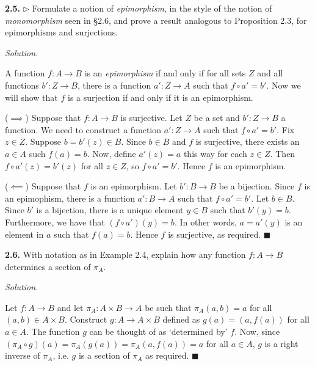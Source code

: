\documentclass[14pt,parskip=full]{scrartcl}
\newcommand{\exercise}[3]{
\noindent
\textbf{#1.} #2

\noindent
\textit{Solution.}{\let\tpar\par \let\par\relax #3}
}
\newcommand*{\QEDA}{\hfill\ensuremath{\blacksquare}}
\begin{document}
\exercise{2.5}{$\rhd$ Formulate a notion of \textit{epimorphism}, in the style
of the notion of \textit{monomorphism} seen in \S 2.6, and prove a result
analogous to Proposition 2.3, for epimorphisms and surjections.}{
A function $f:A\to B$ is an \textit{epimorphism} if and only if for all sets $Z$
and all functions $b':Z\to B$, there is a function $a':Z\to A$ such that $f\circ
a' = b'$. Now we will show that $f$ is a surjection if and only if it is an
epimorphism.

\tpar
($\implies$) Suppose that $f:A\to B$ is surjective. Let $Z$ be a set and
$b':Z\to B$ a function. We need to construct a function $a':Z\to A$ such that
$f\circ a' = b'$. Fix $z\in Z$. Suppose $b=b'(z)\in B$. Since $b\in B$ and $f$
is surjective, there exists an $a\in A$ such $f(a) = b$. Now, define $a'(z) =
a$ this way for each $z\in Z$. Then $f\circ a'(z) = b'(z)$ for all $z\in Z$, so
$f\circ a' = b'$. Hence $f$ is an epimorphism.

\tpar
($\impliedby$) Suppose that $f$ is an epimorphism. Let $b':B\to B$ be a
bijection. Since $f$ is an epimophism, there is a function $a':B\to A$ such that
$f\circ a' = b'$. Let $b\in B$. Since $b'$ is a bijection, there is a unique
element $y\in B$ such that $b'(y) = b$. Furthermore, we have that $(f\circ
a')(y) = b$. In other words, $a = a'(y)$ is an element in $a$ such that $f(a) =
b$. Hence $f$ is surjective, as required.
\QEDA

}

\exercise{2.6}{With notation as in Example 2.4, explain how any function $f:A\to
B$ determines a section of $\pi_A$.}{

Let $f:A\to B$ and let $\pi_A:A\times B\to A$ be such that $\pi_A(a,b) = a$ for
all $(a,b)\in A\times B$. Construct $g:A\to A\times B$ defined as $g(a) = (a,
f(a))$ for all $a\in A$. The function $g$ can be thought of as `determined by'
$f$. Now, since $(\pi_A\circ g)(a) = \pi_A(g(a)) = \pi_A(a, f(a)) = a$ for all
$a\in A$, $g$ is a right inverse of $\pi_A$, i.e. $g$ is a section of $\pi_A$ as
required.
\QEDA

}
\end{document}

